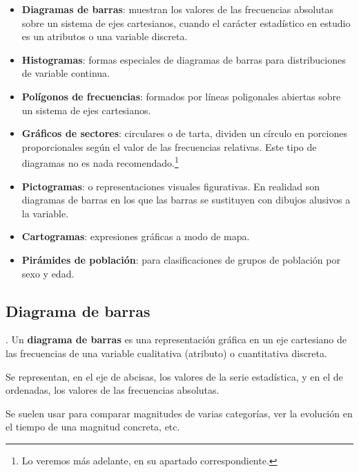 \begin{itemize}
	\item \textbf{Diagramas de barras}: muestran los valores de las frecuencias absolutas sobre un sistema de ejes cartesianos, cuando el carácter estadístico en estudio es un atributos o  una variable discreta.
	\item \textbf{Histogramas}: formas especiales de diagramas de barras para distribuciones de variable continua.
	\item \textbf{Polígonos de frecuencias}: formados por líneas poligonales abiertas sobre un sistema de ejes cartesianos.
	\item \textbf{Gráficos de sectores}: circulares o de tarta, dividen un círculo en porciones proporcionales según el valor de las frecuencias relativas. \textcolor{gris}{Este tipo de diagramas no es nada recomendado.\footnote{Lo veremos más adelante, en su apartado correspondiente.}}
	\item \textbf{Pictogramas}: o representaciones visuales figurativas. En realidad son diagramas de barras en los que las barras se sustituyen con dibujos alusivos a la variable. 
	\item \textbf{Cartogramas}: expresiones gráficas a modo de mapa.
	\item \textbf{Pirámides de población}: para clasificaciones de grupos de población por sexo y edad.
\end{itemize}

\subsection{Diagrama de barras}

\begin{definition}
	. Un \textbf{diagrama de barras} es una representación gráfica en un eje cartesiano de las frecuencias de una variable cualitativa (atributo) o cuantitativa discreta.
		
	\vspace{2mm} Se representan, en el eje de abcisas, los valores de la serie estadística, y en el de ordenadas, los valores de las frecuencias absolutas.
	
	\vspace{2mm} Se suelen usar para comparar magnitudes de varias categorías, ver la evolución en el tiempo de una magnitud concreta, etc.
\end{definition}

